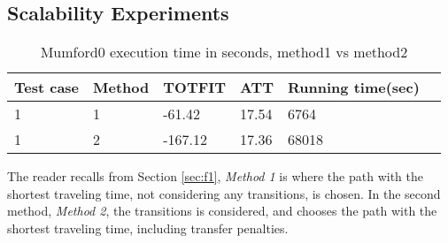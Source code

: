 \subsection{Scalability Experiments}
\label{subsec:scalabilityExperiments_results}

\begin{table}[H]
    \centering
    \begin{tabular}{|l|l|l|l|l|l|}
        \hline
        Test case & Method & TOTFIT & ATT & Running time(sec) \\
        \hline
        1 & 1 & -61.42 & 17.54 & 6764 \\
        1 & 2 & -167.12 & 17.36 & 68018 \\
        
        \hline
    \end{tabular}
    \caption{Mumford0 execution time in seconds, method1 vs method2}
    \label{table:results_mumford}
\end{table}

The reader recalls from Section \vref{sec:f1},  \textit{Method 1} is where the path with the shortest traveling time, not considering any transitions, is chosen. In the second method, \textit{Method 2}, the transitions is considered, and chooses the path with the shortest traveling time, including transfer penalties.




